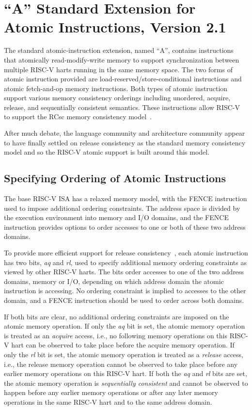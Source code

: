 \chapter{``A'' Standard Extension for Atomic Instructions, Version 2.1}
\label{atomics}

The standard atomic-instruction extension, named ``A'',
contains instructions that atomically
read-modify-write memory to support synchronization between multiple
RISC-V harts running in the same memory space.  The two forms of
atomic instruction provided are load-reserved/store-conditional
instructions and atomic fetch-and-op memory instructions.  Both types
of atomic instruction support various memory consistency orderings
including unordered, acquire, release, and sequentially consistent
semantics.  These instructions allow RISC-V to support the RCsc memory
consistency model~\cite{Gharachorloo90memoryconsistency}.

\begin{commentary}
After much debate, the language community and architecture community
appear to have finally settled on release consistency as the standard
memory consistency model and so the RISC-V atomic support is built
around this model.
\end{commentary}

\section{Specifying Ordering of Atomic Instructions}

The base RISC-V ISA has a relaxed memory model, with the FENCE
instruction used to impose additional ordering constraints.  The
address space is divided by the execution environment into memory and
I/O domains, and the FENCE instruction provides options to order
accesses to one or both of these two address domains.

To provide more efficient support for release
consistency~\cite{Gharachorloo90memoryconsistency}, each atomic
instruction has two bits, {\em aq} and {\em rl}, used to specify
additional memory ordering constraints as viewed by other RISC-V
harts.  The bits order accesses to one of the two address domains,
memory or I/O, depending on which address domain the atomic
instruction is accessing.  No ordering constraint is implied to
accesses to the other domain, and a FENCE instruction should be used
to order across both domains.

If both bits are clear, no additional ordering constraints are imposed
on the atomic memory operation.  If only the {\em aq} bit is set, the
atomic memory operation is treated as an {\em acquire} access, i.e.,
no following memory operations on this RISC-V hart can be observed
to take place before the acquire memory operation.  If only the {\em
  rl} bit is set, the atomic memory operation is treated as a {\em
  release} access, i.e., the release memory operation cannot be
observed to take place before any earlier memory operations on this
RISC-V hart.  If both the {\em aq} and {\em rl} bits are set, the
atomic memory operation is {\em sequentially consistent} and cannot be
observed to happen before any earlier memory operations or after any
later memory operations in the same RISC-V hart and to the same
address domain.

